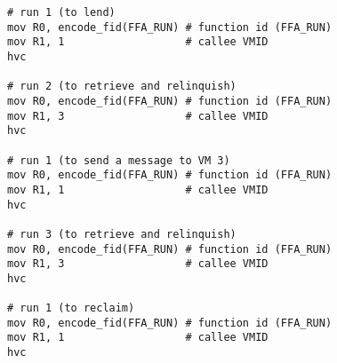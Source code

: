 \documentclass{article}
\begin{document}
\begin{figure}[hbt!]
\centering
{}
\end{figure}

\clearpage

\begin{lstlisting}[caption={VM 0}]
# run 1 (to lend)
mov R0, encode_fid(FFA_RUN) # function id (FFA_RUN)
mov R1, 1                   # callee VMID
hvc

# run 2 (to retrieve and relinquish)
mov R0, encode_fid(FFA_RUN) # function id (FFA_RUN)
mov R1, 3                   # callee VMID
hvc

# run 1 (to send a message to VM 3)
mov R0, encode_fid(FFA_RUN) # function id (FFA_RUN)
mov R1, 1                   # callee VMID
hvc

# run 3 (to retrieve and relinquish)
mov R0, encode_fid(FFA_RUN) # function id (FFA_RUN)
mov R1, 3                   # callee VMID
hvc

# run 1 (to reclaim)
mov R0, encode_fid(FFA_RUN) # function id (FFA_RUN)
mov R1, 1                   # callee VMID
hvc
\end{lstlisting}
\end{document}
